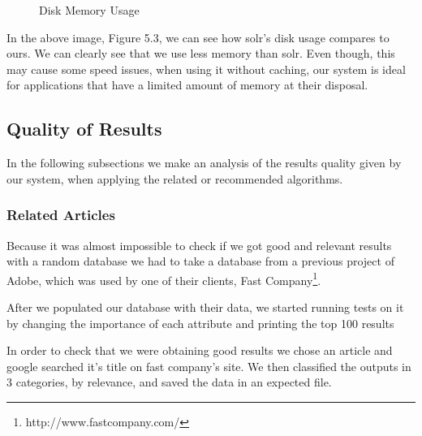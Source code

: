 \begin{figure}[h]
\centering
\caption{Disk Memory Usage}

\label{tikz}
\end{figure}

In the above image, Figure 5.3, we can see how solr's disk usage compares to ours. We can clearly see that we use less memory than solr. Even though, this may cause some speed issues, when using it without caching, our system is ideal for applications that have a limited amount of memory at their disposal.
\subsection{Quality of Results}
\label{sec:quality-of-results}
In the following subsections we make an analysis of the results quality given by our system, when applying the related or recommended algorithms.

\subsubsection{Related Articles}
\label{sec:related-articles}
Because it was almost impossible to check if we got good and relevant results with a random database we had to take a database from a previous project of Adobe, which was used by one of their clients, Fast Company\footnote{http://www.fastcompany.com/}. 

After we populated our database with their data, we started running tests on it by changing the importance of each attribute and printing the top 100 results

In order to check that we were obtaining  good results we chose an article and google searched it's title on fast company’s site. We then classified the outputs in 3 categories, by relevance, and saved the data in an expected file.

